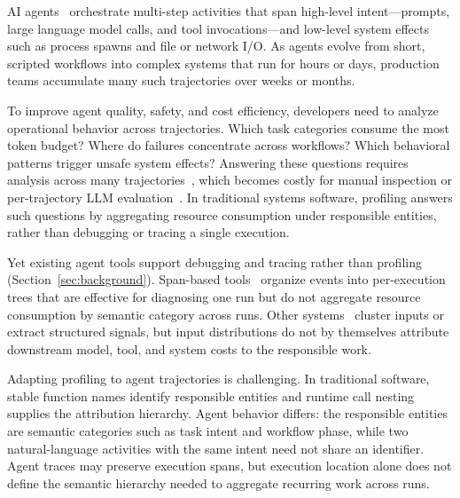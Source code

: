 \documentclass[letterpaper]{article}
\begin{document}
AI agents~\cite{sweagent,claudecode,codexcli,osworld} orchestrate multi-step
activities that span high-level intent---prompts, large language model calls,
and tool invocations---and low-level system effects such as process spawns and
file or network I/O. As agents evolve from short, scripted workflows into
complex systems that run for hours or days, production teams accumulate many
such trajectories over weeks or months.

To improve agent quality, safety, and cost efficiency, developers need to
analyze operational behavior across trajectories. Which task categories
consume the most token budget? Where do failures concentrate across workflows?
Which behavioral patterns trigger unsafe system effects? Answering these
questions requires analysis across many trajectories~\cite{agentatlas,agentrewardbench},
which becomes costly for manual inspection or per-trajectory LLM
evaluation~\cite{llm-as-judge}. In traditional systems software, profiling
answers such questions by aggregating resource consumption under responsible
entities, rather than debugging or tracing a single execution.

Yet existing agent tools support debugging and tracing rather than profiling
(Section~\ref{sec:background}). Span-based tools~\cite{langsmith,langfuse,phoenix,otel}
organize events into per-execution trees that are effective for diagnosing one
run but do not aggregate resource consumption by semantic category across
runs. Other systems~\cite{datadog-llmobs,laminar-signals} cluster inputs or
extract structured signals, but input distributions do not by themselves
attribute downstream model, tool, and system costs to the responsible work.

Adapting profiling to agent trajectories is challenging. In traditional
software, stable function names identify responsible entities and runtime call
nesting supplies the attribution hierarchy. Agent behavior differs: the
responsible entities are semantic categories such as task intent and workflow
phase, while two natural-language activities with the same intent need not
share an identifier. Agent traces may preserve execution spans, but execution
location alone does not define the semantic hierarchy needed to aggregate
recurring work across runs.
\end{document}
